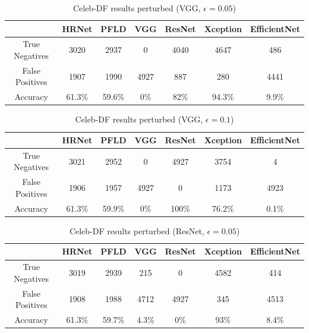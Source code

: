 \begin{table}[H]
    \centering
    \begin{tabular}{|c|c|c|c|c|c|c|}
        \hline
        \textbf{} & \textbf{HRNet} & \textbf{PFLD} &  \textbf{VGG} & \textbf{ResNet} & \textbf{Xception} & \textbf{EfficientNet} \\
        \hline
        True Negatives & 3020 & 2937 & 0 & 4040 & 4647 & 486\\
        \hline
        False Positives & 1907 & 1990 & 4927 & 887 & 280 & 4441\\
        \hline
        Accuracy & 61.3\% & 59.6\% & 0\% & 82\% & 94.3\% & 9.9\% \\
        \hline
    \end{tabular}
    \caption{Celeb-DF results perturbed (VGG, $\epsilon=0.05$)}
    \label{tab:cd-vgg-5}
\end{table}

\begin{table}[H]
    \centering
    \begin{tabular}{|c|c|c|c|c|c|c|}
        \hline
        \textbf{} & \textbf{HRNet} & \textbf{PFLD} &  \textbf{VGG} & \textbf{ResNet} & \textbf{Xception} & \textbf{EfficientNet} \\
        \hline
        True Negatives & 3021 & 2952 & 0 & 4927 & 3754 & 4\\
        \hline
        False Positives & 1906 & 1957 & 4927 & 0 & 1173 & 4923\\
        \hline
        Accuracy & 61.3\% & 59.9\% & 0\% & 100\% & 76.2\% & 0.1\% \\
        \hline
    \end{tabular}
    \caption{Celeb-DF results perturbed (VGG, $\epsilon = 0.1$)}
    \label{tab:cd-vgg-1}
\end{table}

\begin{table}[H]
    \centering
    \begin{tabular}{|c|c|c|c|c|c|c|}
        \hline
        \textbf{} & \textbf{HRNet} & \textbf{PFLD} &  \textbf{VGG} & \textbf{ResNet} & \textbf{Xception} & \textbf{EfficientNet} \\
        \hline
        True Negatives & 3019 & 2939 & 215 & 0 & 4582 & 414\\
        \hline
        False Positives & 1908 & 1988 & 4712 & 4927 & 345 & 4513\\
        \hline
        Accuracy & 61.3\% & 59.7\% & 4.3\% & 0\% & 93\% & 8.4\% \\
        \hline
    \end{tabular}
    \caption{Celeb-DF results perturbed (ResNet, $\epsilon=0.05$)}
    \label{tab:cd-res-5}
\end{table}

